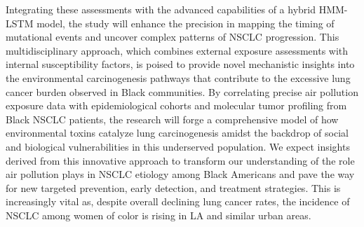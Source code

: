 Integrating these assessments with the advanced capabilities of a hybrid HMM-LSTM model, 
the study will enhance the precision in mapping the timing of mutational events and uncover complex patterns of NSCLC progression. 
This multidisciplinary approach, which combines external exposure assessments with internal susceptibility factors, 
is poised to provide novel mechanistic insights into the environmental carcinogenesis pathways 
that contribute to the excessive lung cancer burden observed in Black communities. 
By correlating precise air pollution exposure data with epidemiological cohorts and molecular tumor profiling from Black NSCLC patients, 
the research will forge a comprehensive model of how environmental toxins catalyze lung carcinogenesis 
amidst the backdrop of social and biological vulnerabilities in this underserved population. 
We expect insights derived from this innovative approach to transform our understanding of the 
role air pollution plays in NSCLC etiology among Black Americans 
and pave the way for new targeted prevention, early detection, and treatment strategies. 
This is increasingly vital as, despite overall declining lung cancer rates, 
the incidence of NSCLC among women of color is rising in LA and similar urban areas. %


